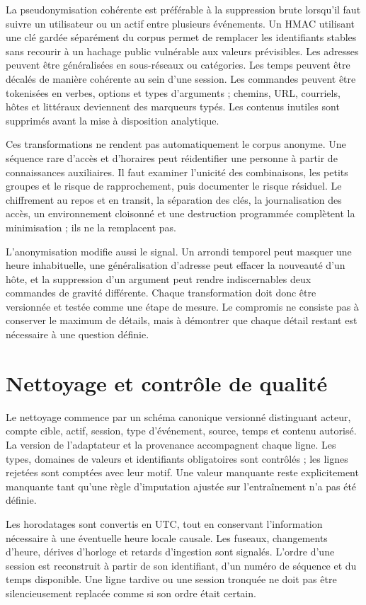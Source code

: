 \documentclass[11pt,a4paper,oneside]{report}
\theoremstyle{definition}
\theoremstyle{plain}
\begin{document}
La pseudonymisation cohérente est préférable à la suppression brute lorsqu'il
faut suivre un utilisateur ou un actif entre plusieurs événements. Un HMAC
utilisant une clé gardée séparément du corpus permet de remplacer les
identifiants stables sans recourir à un hachage public vulnérable aux valeurs
prévisibles. Les adresses peuvent être généralisées en sous-réseaux ou
catégories. Les temps peuvent être décalés de manière cohérente au sein d'une
session. Les commandes peuvent être tokenisées en verbes, options et types
d'arguments ; chemins, URL, courriels, hôtes et littéraux deviennent des
marqueurs typés. Les contenus inutiles sont supprimés avant la mise à
disposition analytique.

Ces transformations ne rendent pas automatiquement le corpus anonyme. Une
séquence rare d'accès et d'horaires peut réidentifier une personne à partir de
connaissances auxiliaires. Il faut examiner l'unicité des combinaisons, les
petits groupes et le risque de rapprochement, puis documenter le risque
résiduel. Le chiffrement au repos et en transit, la séparation des clés, la
journalisation des accès, un environnement cloisonné et une destruction
programmée complètent la minimisation ; ils ne la remplacent pas.

L'anonymisation modifie aussi le signal. Un arrondi temporel peut masquer une
heure inhabituelle, une généralisation d'adresse peut effacer la nouveauté d'un
hôte, et la suppression d'un argument peut rendre indiscernables deux commandes
de gravité différente. Chaque transformation doit donc être versionnée et
testée comme une étape de mesure. Le compromis ne consiste pas à conserver le
maximum de détails, mais à démontrer que chaque détail restant est nécessaire
à une question définie.

\section{Nettoyage et contrôle de qualité}

Le nettoyage commence par un schéma canonique versionné distinguant acteur,
compte cible, actif, session, type d'événement, source, temps et contenu
autorisé. La version de l'adaptateur et la provenance accompagnent chaque
ligne. Les types, domaines de valeurs et identifiants obligatoires sont
contrôlés ; les lignes rejetées sont comptées avec leur motif. Une valeur
manquante reste explicitement manquante tant qu'une règle d'imputation ajustée
sur l'entraînement n'a pas été définie.

Les horodatages sont convertis en UTC, tout en conservant l'information
nécessaire à une éventuelle heure locale causale. Les fuseaux, changements
d'heure, dérives d'horloge et retards d'ingestion sont signalés. L'ordre d'une
session est reconstruit à partir de son identifiant, d'un numéro de séquence et
du temps disponible. Une ligne tardive ou une session tronquée ne doit pas être
silencieusement replacée comme si son ordre était certain.
\end{document}
